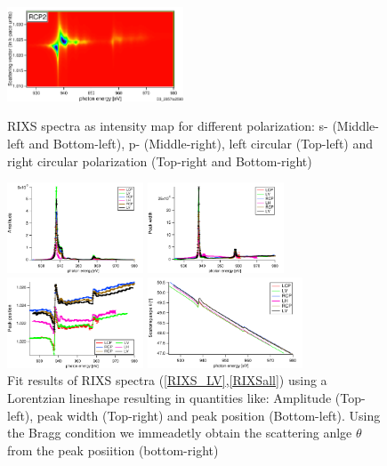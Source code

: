 \documentclass[twocolumn,amsmath,superscriptaddress,amssymb]{revtex4-1}
\begin{document}
\begin{figure}
\begin{minipage}[tp]{0.45\columnwidth}
	\end{minipage}
	\begin{minipage}[tp]{0.45\columnwidth}
		\includegraphics[width = \textwidth, height = 2.8cm]{./RIXS/RCP2.pdf}
	\end{minipage}
	\label{RIXSall}
	\caption{RIXS spectra as intensity map for different polarization: s- (Middle-left and Bottom-left), p- (Middle-right), left circular (Top-left) and right circular polarization (Top-right and Bottom-right)}
	\begin{minipage}[tp]{0.45\columnwidth}
		\includegraphics[width = \textwidth, height = 2.7cm]{amplitude.pdf}
	\end{minipage}
	\begin{minipage}[tp]{0.45\columnwidth}
		\includegraphics[width = \textwidth, height = 2.7cm]{width.pdf}
	\end{minipage}
	\begin{minipage}[tp]{0.45\columnwidth}
		\includegraphics[width = \textwidth, height = 2.7cm]{position.pdf}
	\end{minipage}
	\begin{minipage}[tp]{0.45\columnwidth}
		\includegraphics[width = \textwidth, height = 2.7cm]{ScatAng.pdf}
	\end{minipage}
	\label{FitResults}
\caption{Fit results of RIXS spectra (\ref{RIXS_LV},\ref{RIXSall}) using a Lorentzian lineshape resulting in quantities like: Amplitude (Top-left), peak width (Top-right) and peak position (Bottom-left). Using the Bragg condition we immeadetly obtain the scattering anlge $\theta$ from the peak posiition (bottom-right)}
\end{figure}
%
\end{document}
